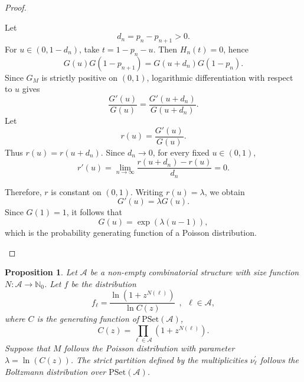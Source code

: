 \documentclass[a4paper,10pt]{article}
\newtheorem{proposition}[theorem]{Proposition}
\theoremstyle{definition}
\newcommand{\Aa}{\mathcal{A}}
\newcommand{\NN}{\mathbb{N}}
\newcommand{\PSet}{\mathrm{PSet}}
\begin{document}
\begin{proof}
\begin{enumerate}
Let
\begin{equation*}
    d_n=p_n-p_{n+1}>0.
\end{equation*}
For $u\in(0,1-d_n)$, take $t=1-p_n-u$. Then $H_n(t)=0$, hence
\begin{equation*}
    G(u)G(1-p_{n+1})=G(u+d_n)G(1-p_n).
\end{equation*}
Since $G_M$ is strictly positive on $(0,1)$, logarithmic differentiation with respect to $u$ gives
\begin{equation*}
    \frac{G'(u)}{G(u)}=\frac{G'(u+d_n)}{G(u+d_n)}.
\end{equation*}
Let
\begin{equation*}
    r(u)=\frac{G'(u)}{G(u)}.
\end{equation*}
Thus $r(u)=r(u+d_n)$. Since $d_n\to0$, for every fixed
$u\in(0,1)$,
\begin{equation*}
    r'(u)=\lim_{n\to\infty}\frac{r(u+d_n)-r(u)}{d_n}=0.
\end{equation*}

Therefore, $r$ is constant on $(0,1)$. Writing
$r(u)=\lambda$, we obtain
\begin{equation*}
    G'(u)=\lambda G(u).
\end{equation*}
Since \(G(1)=1\), it follows that
\begin{equation*}
    G(u)=\exp(\lambda(u-1)),
\end{equation*}
which is the probability generating function of a Poisson distribution.
\end{enumerate}
\end{proof}

\begin{proposition}\label{prop:samplingprop}
Let $\Aa$ be a non-empty combinatorial structure with size function $N:\Aa\rightarrow \NN_0$. Let $f$ be the distribution
\begin{equation} \label{eq:mult}
    f_\ell = \frac{\ln (1+z^{N(\ell)})}{\ln C(z)}~~,~~ \ell\in \Aa,
\end{equation}
where $C$ is the generating function of $\mathit{\PSet}(\Aa)$,
\begin{equation}
    C(z) = \prod_{\ell\in \Aa} (1+z^{N(\ell)}).
\end{equation}
Suppose that $M$ follows the Poisson distribution with parameter $\lambda = \ln (C(z))$. The strict partition defined by the multiplicities $\nu_\ell^{\prime}$ follows the Boltzmann distribution over $\mathit{\PSet}(\Aa)$.
\end{proposition}
\end{document}
